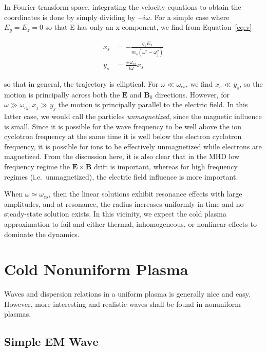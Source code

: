 \documentclass[
  notoc %
]{tufte-book}
\begin{document}
In Fourier transform space, integrating the velocity equations to obtain
the coordinates is done by simply dividing by \(-i\omega\). For a simple
case where \(E_y = E_z = 0\) so that E has only an x-component, we find
from Equation~\ref{eq:v}

\[
\begin{aligned}
x_s &= -\frac{q_sE_x}{m_s(\omega^2 - \omega_j^2)} \\
y_s &= \frac{\pm\omega_{cs}}{i\omega}x_s
\end{aligned}
\]

so that in general, the trajectory is elliptical. For
\(\omega\ll \omega_{cs}\), we find \(x_s \ll y_s\), so the motion is
principally across both the \(\mathbf{E}\) and \(\mathbf{B}_0\)
directions. However, for \(\omega\gg\omega_{cj},x_j\gg y_j\) the motion
is principally parallel to the electric field. In this latter case, we
would call the particles \emph{unmagnetized}, since the magnetic
influence is small. Since it is possible for the wave frequency to be
well above the ion cyclotron frequency at the same time it is well below
the electron cyclotron frequency, it is possible for ions to be
effectively unmagnetized while electrons are magnetized. From the
discussion here, it is also clear that in the MHD low frequency regime
the \(\mathbf{E}\times\mathbf{B}\) drift is important, whereas for high
frequency regimes (i.e.~unmagnetized), the electric field influence is
more important.

When \(\omega\simeq\omega_{cs}\), then the linear solutions exhibit
resonance effects with large amplitudes, and at resonance, the radius
increases uniformly in time and no steady-state solution exists. In this
vicinity, we expect the cold plasma approximation to fail and either
thermal, inhomogeneous, or nonlinear effects to dominate the dynamics.

\hypertarget{cold-nonuniform-plasma}{%
\section{Cold Nonuniform Plasma}\label{cold-nonuniform-plasma}}

Waves and dispersion relations in a uniform plasma is generally nice and
easy. However, more interesting and realistic waves shall be found in
nonuniform plasmas.

\hypertarget{simple-em-wave}{%
\subsection{Simple EM Wave}\label{simple-em-wave}}
\end{document}
